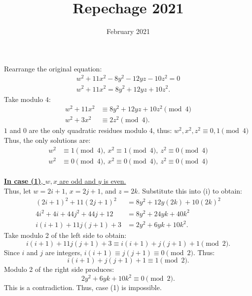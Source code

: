 \documentclass{article}
\title{Repechage 2021}
\date{February 2021}
\begin{document}
Rearrange the original equation:
\begin{align*}
    w^2 + 11x^2 -8y^2 -12yz - 10z^2 = 0 \\
    w^2 + 11x^2 = 8y^2 + 12yz + 10z^2. \tag{i}
\end{align*}
Take modulo $4$:
\begin{align*}
    w^2 + 11x^2 &\equiv 8y^2 + 12yz + 10z^2 \pmod 4\\
    w^2 + 3x^2 &\equiv 2z^2 \pmod 4.
\end{align*}
$1$ and $0$ are the only quadratic residues modulo 4, thus: $w^2, x^2, z^2 \equiv 0,1 \pmod 4$ \\
Thus, the only solutions are:
\begin{align}
    w^2 &\equiv 1 \pmod 4,\ x^2 \equiv 1 \pmod 4,\ z^2 \equiv 0 \pmod 4 \\
    w^2 &\equiv 0 \pmod 4,\ x^2 \equiv 0 \pmod 4,\ z^2 \equiv 0 \pmod 4
\end{align}
\\
\underline{\textbf{In case (1)}, $w,x$ are odd and $y$ is even.} \\
Thus, let $w = 2i + 1$, $x = 2j + 1$, and $z = 2k$. Substitute this into (i) to obtain:
\begin{align*}
    (2i + 1)^2 + 11(2j + 1)^2 &= 8y^2 + 12y(2k) + 10(2k)^2 \\
    4i^2 + 4i + 44j^2 + 44j + 12 &= 8y^2 + 24yk + 40k^2 \\
    i(i + 1) + 11j(j+1) + 3 &= 2y^2 + 6yk + 10k^2.
\end{align*}
Take modulo 2 of the left side to obtain:
$$i(i + 1) + 11j(j+1) + 3 \equiv i(i + 1) + j(j+1) + 1 \pmod 2.$$
Since $i$ and $j$ are integers, $i(i + 1) \equiv j(j+1) \equiv 0 \pmod 2$. Thus:
$$i(i + 1) + j(j+1) + 1 \equiv 1 \pmod 2.$$
Modulo 2 of the right side produces:
$$2y^2 + 6yk + 10k^2 \equiv 0 \pmod 2.$$
This is a contradiction. Thus, case (1) is impossible. \\ \\
\end{document}
